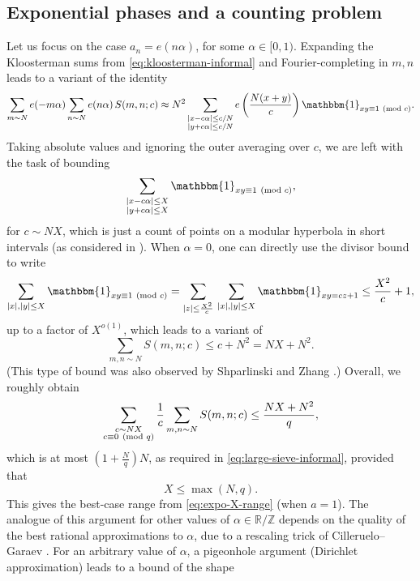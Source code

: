 \documentclass[reqno,11pt]{amsart}
\theoremstyle{remark}
\numberwithin{equation}{section}
\newcommand{\Z}{\mathbb{Z}}
\newcommand{\R}{\mathbb{R}}
\newcommand{\one}{\mathbbm{1}}
\renewcommand{\pmod}[1]{\ (\textnormal{mod } #1)}
\begin{document}
\subsection{Exponential phases and a counting problem} 
\label{subsec:overview-counting}
Let us focus on the case $a_n = e(n\alpha)$, for some $\alpha \in [0, 1)$. Expanding the Kloosterman sums from \cref{eq:kloosterman-informal} and Fourier-completing in $m, n$ leads to a variant of the identity
\begin{equation} \label{eq:Kloosterman-expo-informal}
    \sum_{m \sim N} e(-m\alpha) \sum_{n \sim N} e(n\alpha)\, S(m, n; c)
    \approx 
    N^2 \sum_{\substack{|x - c\alpha| \le c/N \\ |y + c\alpha| \le c/N}} e\left(\frac{N(x+y)}{c} \right) \one_{xy \equiv 1 \pmod{c}}.
\end{equation}
Taking absolute values and ignoring the outer averaging over $c$, we are left with the task of bounding
\begin{equation} \label{eq:combinatorial-counts}
    \sum_{\substack{|x - c\alpha| \le X \\ |y + c\alpha| \le X}} \one_{xy \equiv 1 \pmod{c}},
\end{equation}
for $c \sim NX$,
which is just a count of points on a modular hyperbola in short intervals (as considered in \cite{cilleruelo2011concentration}). When $\alpha = 0$, one can directly use the divisor bound to write
\[
    \sum_{\substack{|x|, |y| \le X}} \one_{xy \equiv 1 \pmod{c}}
    =
    \sum_{|z| \le \frac{X^2}{c}}\, \sum_{|x|, |y| \le X} \one_{xy = cz+1}
    \le 
    \frac{X^2}{c} + 1,
\]
up to a factor of $X^{o(1)}$, which leads to a variant of
\[
    \sum_{m,n \sim N} S(m, n; c) \le c + N^2 = NX + N^2.
\]
(This type of bound was also observed by Shparlinski and Zhang \cite{shparlinski2016cancellations}.)
Overall, we roughly obtain
\begin{equation} \label{eq:final-Kloosterman-informal}
    \sum_{\substack{c \sim NX \\ c \equiv 0 \pmod{q}}} \frac{1}{c} \sum_{m, n \sim N} S(m, n; c)
    \le
    \frac{NX + N^2}{q},
\end{equation}
which is at most $(1 + \frac{N}{q}) N$, as required in \cref{eq:large-sieve-informal}, provided that
\[
    X \le \max(N, q).
\]
This gives the best-case range from \cref{eq:expo-X-range} (when $a = 1$). The analogue of this argument for other values of $\alpha \in \R/\Z$ depends on the quality of the best rational approximations to $\alpha$, due to a rescaling trick of Cilleruelo--Garaev \cite{cilleruelo2011concentration}. For an arbitrary value of $\alpha$, a pigeonhole argument (Dirichlet approximation) leads to a bound of the shape
\end{document}
